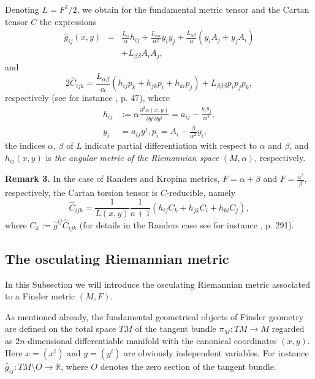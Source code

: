 \documentclass[aps,superscriptaddress, showpacs,preprintnumbers, superscriptaddress, nofootinbibt,twocolumn]{revtex4-2}
\def\bea{\begin{eqnarray}}
\def\eea{\end{eqnarray}}
\newcommand{\R}{\ensuremath{\mathbb{R}}}
\begin{document}
Denoting $L=F^{2}/2$, we obtain
for the fundamental metric tensor and the Cartan tensor $C$ the expressions
\bea
\hat{g}_{ij}(x,y)&=&\frac{L_{\alpha }}{\alpha }h_{ij}+\frac{L_{\alpha \alpha }%
}{\alpha ^{2}}y_{i}y_{j}+\frac{L_{\alpha \beta }}{\alpha }\left(
y_{i}A_{j}+y_{j}A_{i}\right) \nonumber\\
&&+L_{\beta \beta }A_{i}A_{j},
\eea
and
\begin{equation}
2\hat{C}_{ijk}=\frac{L_{\alpha \beta }}{\alpha }\left(
h_{ij}p_{k}+h_{jk}p_{i}+h_{ki}p_{j}\right) +L_{\beta \beta \beta
}p_{i}p_{j}p_{k},  \label{Cijk}
\end{equation}
respectively (see for instance \cite{Ing2}, p. 47), where %
\begin{equation}
\begin{split}
    h_{ij}&:=\alpha\frac{\partial ^{2}\alpha\left( x,y\right)}{\partial y^{i}\partial y^{j}} =a_{ij}-\frac{y_{i}y_{j}}{\alpha ^{2}},\nonumber\\
y_{i}&=a_{ij}y^{j},p_{i}=A_{i}-%
\frac{\beta }{\alpha ^{2}}y_{i},
\end{split}
\end{equation}
 the indices $\alpha $, $\beta $ of $L$ indicate partial differentiation
with respect to $\alpha $ and $\beta$, and $h_{ij}(x,y)$ is {\it the angular metric of the Riemannian space} $(M,\alpha)$, respectively.

{\bf Remark 3.}
In the case of Randers and Kropina metrics, $F=\alpha+\beta$ and $F=\frac{\alpha^2}{\beta}$, respectively,  the Cartan torsion tensor is $C$-reducible, namely
\begin{equation}
    \hat{C}_{ijk}=\frac{1}{L\left( x,y\right) }\frac{1}{n+1}\left(
h_{ij}C_{k}+h_{jk}C_{i}+h_{ki}C_{j}\right),
\end{equation}
where %
$C_{k}:=\hat{g}^{ij}\hat{C}_{ijk}$ (for details in the Randers case see for instance \cite{Bao}, p. 291).

\subsection{The osculating Riemannian metric}

In this Subsection we will introduce the osculating Riemannian metric associated to a Finsler metric $(M,F)$.

As mentioned already, the fundamental geometrical objects of Finsler geometry are defined on the total space $TM$ of the tangent bundle $\pi_M:TM\to M$ regarded as $2n$-dimensional differentiable manifold with the canonical coordinates $(x,y)$. Here $x=(x^i)$ and $y=(y^i)$ are obviously independent variables. For instance $\hat{g}_{ij}:TM\setminus O\to \R$, where $O$ denotes the zero section of the tangent bundle.
\end{document}
